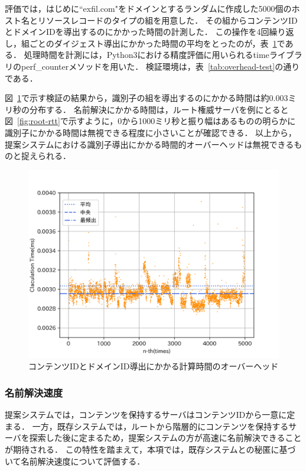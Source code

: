 評価では，はじめに``exfil.com"をドメインとするランダムに作成した5000個のホスト名とリソースレコードのタイプの組を用意した．
その組からコンテンツIDとドメインIDを導出するのにかかった時間の計測した．
この操作を4回繰り返し，組ごとのダイジェスト導出にかかった時間の平均をとったのが，表~\ref{fig:overhead}である．
処理時間を計測には，Python3における精度評価に用いられるtimeライブラリのperf\_counterメソッドを用いた．
検証環境は，表~\ref{tab:overhead-test}の通りである．



図~\ref{fig:overhead}で示す検証の結果から，識別子の組を導出するのにかかる時間は約0.003ミリ秒の分布する．
名前解決にかかる時間は，ルート権威サーバを例にとると図~\ref{fig:root-rtt}で示すように，0から1000ミリ秒と振り幅はあるものの明らかに識別子にかかる時間は無視できる程度に小さいことが確認できる．
以上から，提案システムにおける識別子導出にかかる時間的オーバーヘッドは無視できるものと捉えられる．

\begin{figure}[htbp]
 \centering
 \includegraphics[scale=0.4]{figure/overhead.png}
 \caption[識別子導出にかかる時間的オーバーヘッド]{コンテンツIDとドメインID導出にかかる計算時間のオーバーヘッド}
 \label{fig:overhead}
\end{figure}


\subsubsection{名前解決速度}
\label{sec:resolution_speed}
提案システムでは，コンテンツを保持するサーバはコンテンツIDから一意に定まる．
一方，既存システムでは，ルートから階層的にコンテンツを保持するサーバを探索した後に定まるため，提案システムの方が高速に名前解決できることが期待される．
この特性を踏まえて，本項では，既存システムとの秘匿に基づいて名前解決速度について評価する．

